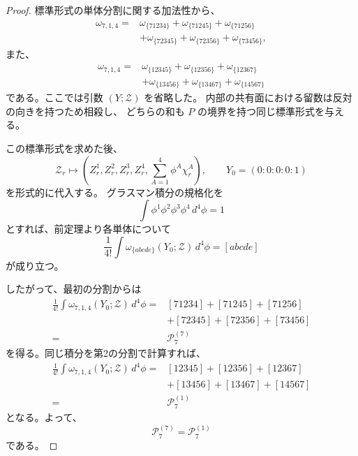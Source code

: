 \documentclass[uplatex,dvipdfmx,a4paper,11pt]{jsarticle}
\renewcommand{\proofname}{Proof}
\newenvironment{myproof}[1][\proofname]
  {\begin{proof}[#1]}
  {\end{proof}}
\numberwithin{equation}{section}
\begin{document}
\begin{myproof}
  標準形式の単体分割に関する加法性から、
  \[
    \begin{aligned}
      \omega_{7,1,4}
      ={}&
        \omega_{\{71234\}}
        +\omega_{\{71245\}}
        +\omega_{\{71256\}}\\
        &+\omega_{\{72345\}}
        +\omega_{\{72356\}}
        +\omega_{\{73456\}},
    \end{aligned}
  \]
  また、
  \[
    \begin{aligned}
      \omega_{7,1,4}
      ={}&
        \omega_{\{12345\}}
        +\omega_{\{12356\}}
        +\omega_{\{12367\}}\\
        &+\omega_{\{13456\}}
        +\omega_{\{13467\}}
        +\omega_{\{14567\}}
    \end{aligned}
  \]
  である。ここでは引数 $(Y;\mathcal Z)$ を省略した。
  内部の共有面における留数は反対の向きを持つため相殺し、
  どちらの和も $P$ の境界を持つ同じ標準形式を与える。

  この標準形式を求めた後、
  \[
    \mathcal Z_r
      \longmapsto
      \left(
        Z_r^1,Z_r^2,Z_r^3,Z_r^4,
        \sum_{A=1}^{4}\phi^A\chi_r^A
      \right),
    \qquad
    Y_0=(0:0:0:0:1)
  \]
  を形式的に代入する。
  グラスマン積分の規格化を
  \[
    \int\phi^1\phi^2\phi^3\phi^4\,d^4\phi=1
  \]
  とすれば、前定理より各単体について
  \[
    \frac1{4!}
    \int
    \omega_{\{abcde\}}(Y_0;\mathcal Z)\,d^4\phi
      =[abcde]
  \]
  が成り立つ。

  したがって、最初の分割からは
  \[
    \begin{aligned}
      \frac1{4!}
      \int\omega_{7,1,4}(Y_0;\mathcal Z)\,d^4\phi
      ={}&
        [71234]+[71245]+[71256]\\
        &+[72345]+[72356]+[73456]\\
      ={}&\mathcal P_7^{(7)}
    \end{aligned}
  \]
  を得る。同じ積分を第2の分割で計算すれば、
  \[
    \begin{aligned}
      \frac1{4!}
      \int\omega_{7,1,4}(Y_0;\mathcal Z)\,d^4\phi
      ={}&
        [12345]+[12356]+[12367]\\
        &+[13456]+[13467]+[14567]\\
      ={}&\mathcal P_7^{(1)}
    \end{aligned}
  \]
  となる。よって、
  \[
    \mathcal P_7^{(7)}=\mathcal P_7^{(1)}
  \]
  である。


\end{myproof}
\end{document}
